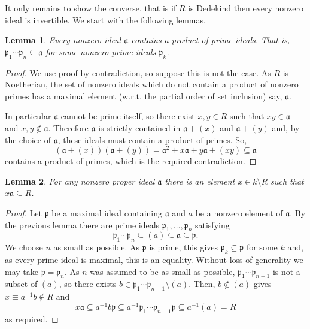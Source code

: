 \documentclass[12pt]{article}
\newtheorem*{lemma*}{Lemma}
\begin{document}
It only remains to show the converse, that is if $R$ is Dedekind then every nonzero ideal is invertible. We start with the following lemmas.

\begin{lemma*}
Every nonzero ideal $\mathfrak{a}$ contains a product of prime ideals. That is, $\mathfrak{p}_1\cdots\mathfrak{p}_n\subseteq\mathfrak{a}$ for some nonzero prime ideals $\mathfrak{p}_k$.
\end{lemma*}
\begin{proof}
We use proof by contradiction, so suppose this is not the case. As $R$ is Noetherian, the set of nonzero ideals which do not contain a product of nonzero primes has a maximal element (w.r.t. the partial order of set inclusion) say, $\mathfrak{a}$.

In particular $\mathfrak{a}$ cannot be prime itself, so there exist $x,y\in R$ such that $xy\in \mathfrak{a}$ and $x,y\not\in \mathfrak{a}$.
Therefore $\mathfrak{a}$ is strictly contained in $\mathfrak{a}+(x)$ and $\mathfrak{a}+(y)$ and, by the choice of $\mathfrak{a}$, these ideals must contain a product of primes. So,
\begin{equation*}
(\mathfrak{a}+(x))(\mathfrak{a}+(y))=\mathfrak{a}^2 +x\mathfrak{a} +y\mathfrak{a} +(xy)\subseteq\mathfrak{a}
\end{equation*}
contains a product of primes, which is the required contradiction.
\end{proof}

\begin{lemma*}
For any nonzero proper ideal $\mathfrak{a}$ there is an element $x\in k\setminus R$ such that $x\mathfrak{a}\subseteq R$.
\end{lemma*}
\begin{proof}
Let $\mathfrak{p}$ be a maximal ideal containing $\mathfrak{a}$ and $a$ be a nonzero element of $\mathfrak{a}$. By the previous lemma there are prime ideals $\mathfrak{p}_1,\ldots,\mathfrak{p}_n$ satisfying
\begin{equation*}
\mathfrak{p}_1\cdots\mathfrak{p}_n\subseteq(a)\subseteq \mathfrak{a}\subseteq\mathfrak{p}.
\end{equation*}
We choose $n$ as small as possible. As $\mathfrak{p}$ is prime, this gives $\mathfrak{p}_k\subseteq\mathfrak{p}$ for some $k$ and, as every prime ideal is maximal, this is an equality. Without loss of generality we may take $\mathfrak{p}=\mathfrak{p}_n$.
As $n$ was assumed to be as small as possible, $\mathfrak{p}_1\cdots\mathfrak{p}_{n-1}$ is not a subset of $(a)$, so there exists $b\in\mathfrak{p}_1\cdots\mathfrak{p}_{n-1}\setminus(a)$. Then, $b\not\in(a)$ gives $x\equiv a^{-1}b\not\in R$ and
\begin{equation*}
x\mathfrak{a}\subseteq a^{-1}b\mathfrak{p}\subseteq a^{-1}\mathfrak{p}_1\cdots\mathfrak{p}_{n-1}\mathfrak{p}\subseteq a^{-1}(a)=R
\end{equation*}
as required.
\end{proof}
\end{document}
